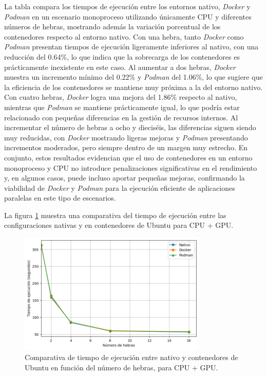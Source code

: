 La tabla compara los tiempos de ejecución entre los entornos nativo, \textit{Docker} y \textit{Podman} en un escenario monoproceso utilizando únicamente CPU y diferentes números de hebras, mostrando además la variación porcentual de los contenedores respecto al entorno nativo. Con una hebra, tanto \textit{Docker} como \textit{Podman} presentan tiempos de ejecución ligeramente inferiores al nativo, con una reducción del 0.64\%, lo que indica que la sobrecarga de los contenedores es prácticamente inexistente en este caso. Al aumentar a dos hebras, \textit{Docker} muestra un incremento mínimo del 0.22\% y \textit{Podman} del 1.06\%, lo que sugiere que la eficiencia de los contenedores se mantiene muy próxima a la del entorno nativo. Con cuatro hebras, \textit{Docker} logra una mejora del 1.86\% respecto al nativo, mientras que \textit{Podman} se mantiene prácticamente igual, lo que podría estar relacionado con pequeñas diferencias en la gestión de recursos internos. Al incrementar el número de hebras a ocho y dieciséis, las diferencias siguen siendo muy reducidas, con \textit{Docker} mostrando ligeras mejoras y \textit{Podman} presentando incrementos moderados, pero siempre dentro de un margen muy estrecho. En conjunto, estos resultados evidencian que el uso de contenedores en un entorno monoproceso y CPU no introduce penalizaciones significativas en el rendimiento y, en algunos casos, puede incluso aportar pequeñas mejoras, confirmando la viabilidad de \textit{Docker} y \textit{Podman} para la ejecución eficiente de aplicaciones paralelas en este tipo de escenarios.

La figura \ref{fig:single-node_ubuntu_container_vs_native_gpu_time} muestra una comparativa del tiempo de ejecución entre las configuraciones nativas y en contenedores de Ubuntu para CPU + GPU.

\begin{figure}[H]
    \centering
    \includegraphics[width=0.8\textwidth]{imagenes/cap5/single-node_ubuntu_container_vs_native_gpu_time.png}
    \caption{Comparativa de tiempo de ejecución entre nativo y contenedores de Ubuntu en función del número de hebras, para CPU + GPU.}
    \label{fig:single-node_ubuntu_container_vs_native_gpu_time}
\end{figure}

